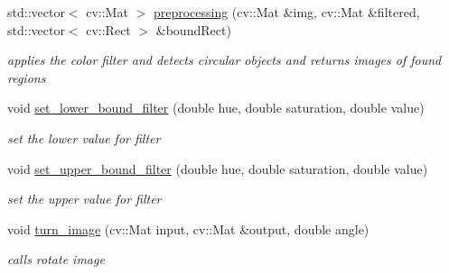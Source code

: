 \begin{DoxyCompactItemize}
std\+::vector$<$ cv\+::\+Mat $>$ \mbox{\hyperlink{class_image_processing_1_1_character___recognition___algorithm_a649e7aeabaa4bc0350ad13a053e4e720}{preprocessing}} (cv\+::\+Mat \&img, cv\+::\+Mat \&filtered, std\+::vector$<$ cv\+::\+Rect $>$ \&bound\+Rect)
\begin{DoxyCompactList}\small\item\em applies the color filter and detects circular objects and returns images of found regions \end{DoxyCompactList}\item 
\mbox{\label{class_image_processing_1_1_character___recognition___algorithm_abf787b74e22f19882892b0542ed8451f}} 
void \mbox{\hyperlink{class_image_processing_1_1_character___recognition___algorithm_abf787b74e22f19882892b0542ed8451f}{set\+\_\+lower\+\_\+bound\+\_\+filter}} (double hue, double saturation, double value)
\begin{DoxyCompactList}\small\item\em set the lower value for filter \end{DoxyCompactList}\item 
\mbox{\label{class_image_processing_1_1_character___recognition___algorithm_ae46d414c856535dd69b51b2cd80ec486}} 
void \mbox{\hyperlink{class_image_processing_1_1_character___recognition___algorithm_ae46d414c856535dd69b51b2cd80ec486}{set\+\_\+upper\+\_\+bound\+\_\+filter}} (double hue, double saturation, double value)
\begin{DoxyCompactList}\small\item\em set the upper value for filter \end{DoxyCompactList}\item 
\mbox{\label{class_image_processing_1_1_character___recognition___algorithm_a66568e425dfb386f8a78326867b628fd}} 
void \mbox{\hyperlink{class_image_processing_1_1_character___recognition___algorithm_a66568e425dfb386f8a78326867b628fd}{turn\+\_\+image}} (cv\+::\+Mat input, cv\+::\+Mat \&output, double angle)
\begin{DoxyCompactList}\small\item\em calls rotate image \end{DoxyCompactList}\end{DoxyCompactItemize}
